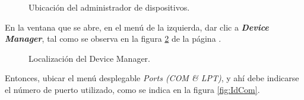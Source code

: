 \begin{figure}[H] %
\caption{Ubicación del administrador de dispositivos.}
\label{fig:Man}
\end{figure}

En la ventana que se abre, en el menú de la izquierda, dar clic a \textit{\textbf{Device Manager}}, tal como se observa en la figura \ref{fig:DevM} de la página \pageref{fig:DevM}. 

\begin{figure}[H] %
\caption{Localización del Device Manager.}
\label{fig:DevM}
\end{figure}

Entonces, ubicar el menú desplegable \textit{Ports (COM \& LPT)}, y ahí debe indicarse el número de puerto utilizado, como se indica en la figura \ref{fig:IdCom}.

